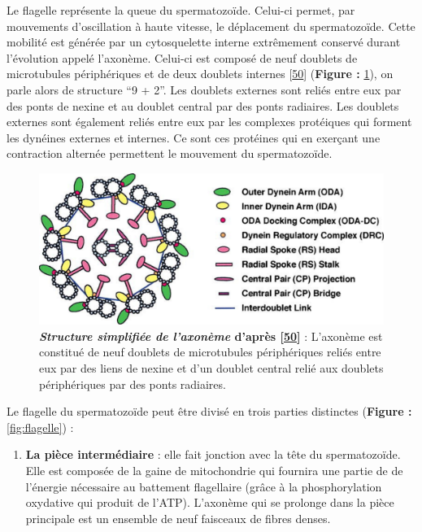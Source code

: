 \documentclass[12pt,a4paper,twoside]{ugathesis}
\providecommand{\tightlist}{%
  \setlength{\itemsep}{0pt}\setlength{\parskip}{0pt}}
\theoremstyle{definition}
\theoremstyle{definition}
\theoremstyle{definition}
\theoremstyle{remark}
\begin{document}
Le flagelle représente la queue du spermatozoïde. Celui-ci permet, par
mouvements d'oscillation à haute vitesse, le déplacement du
spermatozoïde. Cette mobilité est générée par un cytosquelette interne
extrêmement conservé durant l'évolution appelé l'axonème. Celui-ci est
composé de neuf doublets de microtubules périphériques et de deux
doublets internes {[}\protect\hyperlink{ref-Inaba2003}{50}{]}
(\textbf{Figure : }\ref{fig:pictaxoneme}), on parle alors de structure
``9 + 2''. Les doublets externes sont reliés entre eux par des ponts de
nexine et au doublet central par des ponts radiaires. Les doublets
externes sont également reliés entre eux par les complexes protéiques
qui forment les dynéines externes et internes. Ce sont ces protéines qui
en exerçant une contraction alternée permettent le mouvement du
spermatozoïde.







\begin{figure}

{\centering \includegraphics[scale=.3]{figure/axoneme} 

}

\caption[Structure simplifiée de l'axonème]{\textbf{\emph{Structure simplifiée de l'axonème}
d'après {[}\protect\hyperlink{ref-Inaba2003}{50}{]}} : L'axonème est
constitué de neuf doublets de microtubules périphériques reliés entre
eux par des liens de nexine et d'un doublet central relié aux doublets
périphériques par des ponts radiaires.}\label{fig:pictaxoneme}
\end{figure}

Le flagelle du spermatozoïde peut être divisé en trois parties
distinctes (\textbf{Figure : }\ref{fig:flagelle}) :

\begin{enumerate}
\def\labelenumi{\arabic{enumi}.}
\tightlist
\item
  \textbf{La pièce intermédiaire} : elle fait jonction avec la tête du
  spermatozoïde. Elle est composée de la gaine de mitochondrie qui
  fournira une partie de de l'énergie nécessaire au battement
  flagellaire (grâce à la phosphorylation oxydative qui produit de
  l'ATP). L'axonème qui se prolonge dans la pièce principale est un
  ensemble de neuf faisceaux de fibres denses.
\end{enumerate}
\end{document}
